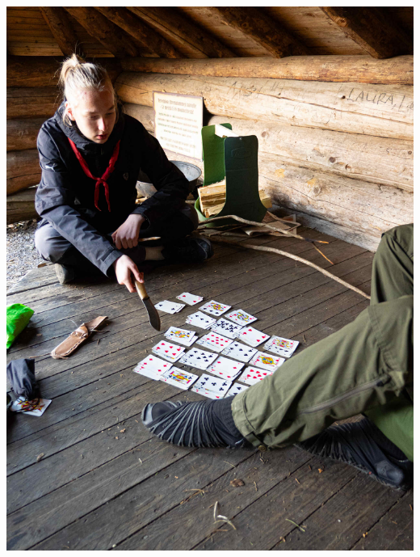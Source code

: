 \begin{Figure}
\begin{center}
\begin{multicols}{2}
\begin{center}
			\noindent\includegraphics[width=1.05\linewidth]{assets/pyörävaellus15}
		\end{center}
	\end{multicols}
	\vspace*{-0.32cm}
\end{center}
\end{Figure}


